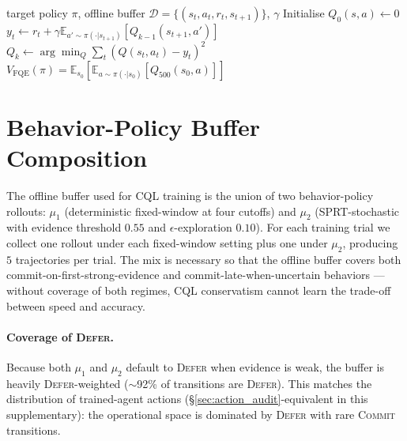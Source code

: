\documentclass[conference]{IEEEtran}
\newcommand{\cql}{CQL}
\begin{document}
\begin{algorithm}[h]
\caption{Per-target-policy FQE}
\label{alg:fqe}
\begin{algorithmic}[1]
\Require target policy $\pi$, offline buffer
       $\mathcal{D} = \{(s_t, a_t, r_t, s_{t+1})\}$, $\gamma$
\State Initialise $Q_0(s, a) \leftarrow 0$
  \State $y_t \leftarrow r_t + \gamma \mathbb{E}_{a' \sim \pi(\cdot | s_{t+1})}[Q_{k-1}(s_{t+1}, a')]$
  \State $Q_k \leftarrow \arg\min_Q \sum_t (Q(s_t, a_t) - y_t)^2$
\EndFor
\State \Return $V_{\text{FQE}}(\pi) = \mathbb{E}_{s_0}[\mathbb{E}_{a \sim \pi(\cdot | s_0)}[Q_{500}(s_0, a)]]$
\end{algorithmic}
\end{algorithm}

\section{Behavior-Policy Buffer Composition}

The offline buffer used for \cql{} training is the union of two
behavior-policy rollouts: $\mu_1$ (deterministic fixed-window at
four cutoffs) and $\mu_2$ (SPRT-stochastic with evidence threshold
$0.55$ and $\epsilon$-exploration $0.10$). For each training trial
we collect one rollout under each fixed-window setting plus one
under $\mu_2$, producing $5$ trajectories per trial. The mix is
necessary so that the offline buffer covers both commit-on-first-strong-evidence
and commit-late-when-uncertain behaviors --- without coverage of
both regimes, \cql{} conservatism cannot learn the trade-off
between speed and accuracy.

\paragraph{Coverage of \textsc{Defer}.}
Because both $\mu_1$ and $\mu_2$ default to \textsc{Defer} when
evidence is weak, the buffer is heavily \textsc{Defer}-weighted
($\sim$92\% of transitions are \textsc{Defer}). This matches the
distribution of trained-agent actions
(\S\ref{sec:action_audit}-equivalent in this supplementary): the
operational space is dominated by \textsc{Defer} with rare
\textsc{Commit} transitions.



\end{document}
